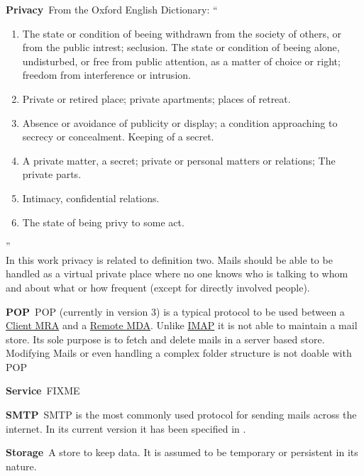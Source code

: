 \documentclass[10pt,a4paper]{scrbook}
\newenvironment{entry}{\par\leavevmode\hangpara{1.5mm}{1}\ignorespaces}{\RaggedRight\par}
\newcommand*{\mainentry}[2]{{\bfseries{#1\label{def:#1}}}~#2\par}
\newcommand*{\defref}[1]{\hyperref[def:#1]{#1}}
\begin{document}
\begin{appendices}
\begin{entry}
  \mainentry{Privacy}{From the Oxford English Dictionary: ``
    \begin{enumerate}
      \item The state or condition of beeing withdrawn from the society of others, or from the public intrest; seclusion. The state or condition of beeing alone, undisturbed, or free from public attention, as a matter of choice or right; freedom from interference or intrusion.
      \item Private or retired place; private apartments; places of retreat.
      \item Absence or avoidance of publicity or display; a condition approaching to secrecy or concealment. Keeping of a secret.
      \item A private matter, a secret; private or personal matters or relations; The private parts.
      \item Intimacy, confidential relations.
      \item The state of being privy to some act.
    \end{enumerate}''\cite[FIXME]{OXFORD}\\
    In this work privacy is related to definition two. Mails should be able to be handled as a virtual private place where no one knows who is talking to whom and about what or how frequent (except for directly involved people).
  }
\end{entry}

\begin{entry}
  \mainentry{POP}{POP (currently in version 3) is a typical protocol to be used between a \defref{Client MRA} and a \defref{Remote MDA}. Unlike \defref{IMAP} it is not able to maintain a mail store. Its sole purpose is to fetch and delete mails in a server based store. Modifying Mails or even handling a complex folder structure is not doable with POP}
\end{entry}

\begin{entry}
  \mainentry{Service}{FIXME}
\end{entry}

\begin{entry}
  \mainentry{SMTP}{SMTP is the most commonly used protocol for sending mails across the internet. In its current version it has been specified in \cite{RFC5321}.}
\end{entry}

\begin{entry}
  \mainentry{Storage}{A store to keep data. It is assumed to be temporary or persistent in its nature.}
\end{entry}


\end{appendices}
\end{document}
